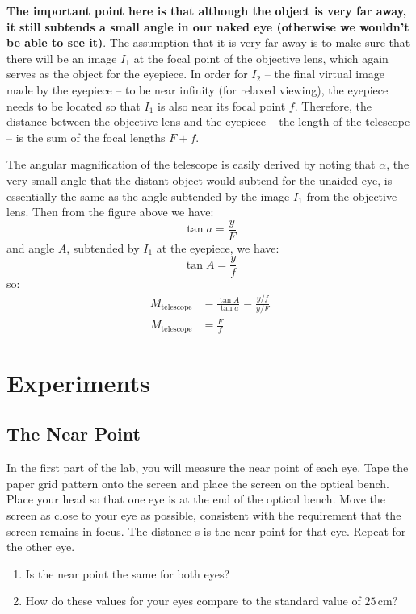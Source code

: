 \textbf{The important point here is that although the object is very far away, it still subtends a small angle in our naked eye (otherwise we wouldn't be able to see it)}. The assumption that it is very far away is to make sure that there will be an image $I_1$ at the focal point of the objective lens, which again serves as the object for the eyepiece. In order for $I_2$ -- the final virtual image made by the eyepiece -- to be near infinity (for relaxed viewing), the eyepiece needs to be located so that $I_1$ is also near its focal point $f$. Therefore, the distance between the objective lens and the eyepiece -- the length of the telescope -- is the sum of the focal lengths $F+f$.\myskip

The angular magnification of the telescope is easily derived by noting that $\alpha$, the very small angle that the distant object would subtend for the \underline{unaided eye}, is essentially the same as the angle subtended by the image $I_1$ from the objective lens. Then from the figure above we have:
\begin{equation}
  \tan a=\frac{y}{F}
\end{equation}
and angle $A$, subtended by $I_1$ at the eyepiece, we have:
\begin{equation}
  \tan A =\frac{y}{f}
\end{equation}
so:
\begin{align}
  M_{\mathrm{telescope}}&=\frac{\tan A}{\tan a}=\frac{y/f}{y/F}\\
  M_{\mathrm{telescope}}&=\frac{F}{f}
\end{align}


\section{Experiments}

\subsection{The Near Point}
In the first part of the lab, you will measure the near point of each eye. Tape the paper grid pattern onto the screen and place the screen on the optical bench. Place your head so that one eye is at the end of the  optical bench. Move the screen as close to your eye as possible, consistent with the requirement that the screen remains in focus. The distance s is the near point for that eye. Repeat for the other eye.
\begin{enumerate}
\item Is the near point the same for both eyes?
\item How do these values for your eyes compare to the standard value of $25\, \textrm{cm}$?
\end{enumerate}

